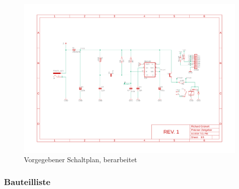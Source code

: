 \documentclass[a4paper, 12pt]{article}
\begin{document}
        \begin{figure}[H]
        \centering
        \includegraphics[page=1, scale=0.5]{graphics/PZ_schm}
        \caption{Vorgegebener Schaltplan, berarbeitet}
        \label{fig:2}
        \end{figure}





    \subsubsection{Bauteilliste}
\end{document}
